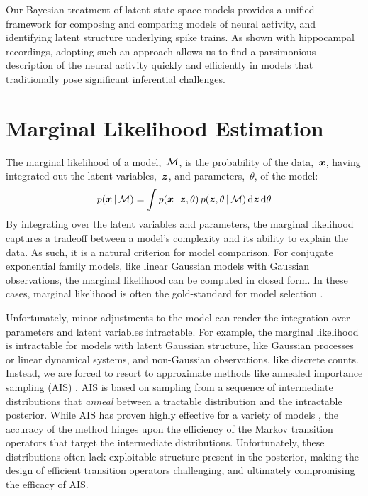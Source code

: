 Our Bayesian treatment of latent state space models provides a unified 
framework for composing and comparing models of neural activity, and 
identifying latent structure underlying spike trains. As shown with
hippocampal recordings, adopting such an approach allows us to find
a parsimonious description of the neural activity quickly and efficiently
in models that traditionally pose significant inferential challenges.



\section{Marginal Likelihood Estimation}
The marginal likelihood of a model,~$\mathcal{M}$, is the probability of the
data,~$\boldsymbol{x}$, having integrated out the latent
variables,~$\boldsymbol{z}$, and parameters,~$\theta$, of the model:
\begin{align*}
  {p(\boldsymbol{x}\,|\,\mathcal{M}) = \int p(\boldsymbol{x}\,|\,\boldsymbol{z}, \theta) \, p(\boldsymbol{z}, \theta
  \,|\,\mathcal{M}) \, \mathrm{d} \boldsymbol{z}\, \mathrm{d}\theta}
\end{align*}
By integrating over the latent variables and parameters, the marginal
likelihood captures a tradeoff between a model's complexity and its
ability to explain the data.  As such, it is a natural criterion for
model comparison. For conjugate exponential family 
models, like linear Gaussian models with Gaussian observations,
 the marginal likelihood can be computed in closed form. 
In these cases, marginal likelihood is often the gold-standard 
for model selection \cite{kass1995bayes}.

Unfortunately, minor adjustments to the model can render the
integration over parameters and latent variables intractable.  For
example, the marginal likelihood is intractable for models with latent
Gaussian structure, like Gaussian processes or linear dynamical
systems, and non-Gaussian observations, like discrete counts.
Instead, we are forced to resort to approximate methods like annealed
importance sampling (AIS) \cite{neal2001annealed}.  AIS is based on
sampling from a sequence of intermediate distributions that
\emph{anneal} between a tractable distribution and the intractable
posterior. While AIS has proven highly effective for a variety of
models \cite{grosse2015sandwiching}, the accuracy of the method hinges
upon the efficiency of the Markov transition operators that target
the intermediate distributions.  Unfortunately, these distributions
often lack exploitable structure present in the posterior, making the
design of efficient transition operators challenging, and ultimately
compromising the efficacy of AIS.


